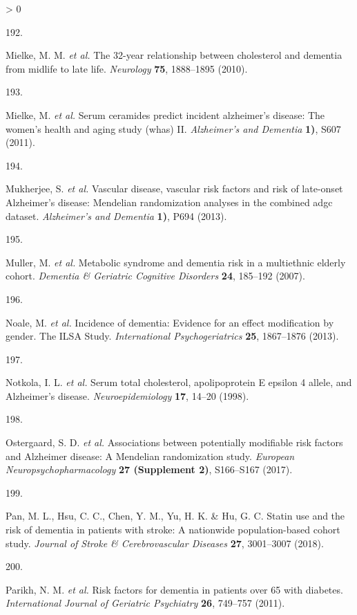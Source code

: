 \documentclass[a4paper, twoside]{templates/ociamthesis}
\newlength{\cslhangindent}
\newlength{\csllabelwidth}
\newenvironment{CSLReferences}[3] %
 {%
  \setlength{\parindent}{0pt}
  \ifodd #1 \everypar{\setlength{\hangindent}{\cslhangindent}}\ignorespaces\fi
  \ifnum #2 > 0
  \setlength{\parskip}{#2\baselineskip}
  \fi
 }%
 {}
\newcommand{\CSLLeftMargin}[1]{\parbox[t]{\maxof{\widthof{#1}}{\csllabelwidth}}{#1}}
\newcommand{\CSLRightInline}[1]{\parbox[t]{\linewidth - \csllabelwidth}{#1}}
\begin{document}
\begin{CSLReferences}{0}{0}
\leavevmode\hypertarget{ref-mielke2010a}{}%
\CSLLeftMargin{192. }
\CSLRightInline{Mielke, M. M. \emph{et al.} The 32-year relationship between cholesterol and dementia from midlife to late life. \emph{Neurology} \textbf{75}, 1888--1895 (2010).}

\leavevmode\hypertarget{ref-mielke2011}{}%
\CSLLeftMargin{193. }
\CSLRightInline{Mielke, M. \emph{et al.} Serum ceramides predict incident alzheimer's disease: {The} women's health and aging study (whas) {II}. \emph{Alzheimer's and Dementia} \textbf{1)}, S607 (2011).}

\leavevmode\hypertarget{ref-mukherjee2013}{}%
\CSLLeftMargin{194. }
\CSLRightInline{Mukherjee, S. \emph{et al.} Vascular disease, vascular risk factors and risk of late-onset {Alzheimer}'s disease: {Mendelian} randomization analyses in the combined adgc dataset. \emph{Alzheimer's and Dementia} \textbf{1)}, P694 (2013).}

\leavevmode\hypertarget{ref-muller2007}{}%
\CSLLeftMargin{195. }
\CSLRightInline{Muller, M. \emph{et al.} Metabolic syndrome and dementia risk in a multiethnic elderly cohort. \emph{Dementia \& Geriatric Cognitive Disorders} \textbf{24}, 185--192 (2007).}

\leavevmode\hypertarget{ref-noale2013}{}%
\CSLLeftMargin{196. }
\CSLRightInline{Noale, M. \emph{et al.} Incidence of dementia: Evidence for an effect modification by gender. {The ILSA Study}. \emph{International Psychogeriatrics} \textbf{25}, 1867--1876 (2013).}

\leavevmode\hypertarget{ref-notkola1998}{}%
\CSLLeftMargin{197. }
\CSLRightInline{Notkola, I. L. \emph{et al.} Serum total cholesterol, apolipoprotein {E} epsilon 4 allele, and {Alzheimer}'s disease. \emph{Neuroepidemiology} \textbf{17}, 14--20 (1998).}

\leavevmode\hypertarget{ref-ostergaard2017}{}%
\CSLLeftMargin{198. }
\CSLRightInline{Ostergaard, S. D. \emph{et al.} Associations between potentially modifiable risk factors and {Alzheimer} disease: {A Mendelian} randomization study. \emph{European Neuropsychopharmacology} \textbf{27 (Supplement 2)}, S166--S167 (2017).}

\leavevmode\hypertarget{ref-pan2018}{}%
\CSLLeftMargin{199. }
\CSLRightInline{Pan, M. L., Hsu, C. C., Chen, Y. M., Yu, H. K. \& Hu, G. C. Statin use and the risk of dementia in patients with stroke: {A} nationwide population-based cohort study. \emph{Journal of Stroke \& Cerebrovascular Diseases} \textbf{27}, 3001--3007 (2018).}

\leavevmode\hypertarget{ref-parikh2011}{}%
\CSLLeftMargin{200. }
\CSLRightInline{Parikh, N. M. \emph{et al.} Risk factors for dementia in patients over 65 with diabetes. \emph{International Journal of Geriatric Psychiatry} \textbf{26}, 749--757 (2011).}


\end{CSLReferences}
\end{document}
